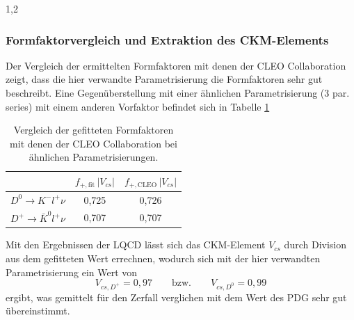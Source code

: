 \documentclass[11pt,a4paper,twoside]{report}
\begin{document}
\begin{spacing}{1,2}
\subsubsection*{Formfaktorvergleich und Extraktion des CKM-Elements}
Der Vergleich der ermittelten Formfaktoren mit denen der CLEO Collaboration \cite{PhysRev_Data} zeigt, dass die hier verwandte Parametrisierung die Formfaktoren
sehr gut beschreibt. Eine Gegenüberstellung mit einer ähnlichen Parametrisierung (3 par. series) mit einem anderen Vorfaktor befindet sich in Tabelle \ref{tab_formvergleich}
\begin{table}[h]
 \begin{tabular}{c|cc}
 \toprule
  & $f_{+,\text{fit}}\,|V_{cs}|$ & $f_{+,\text{CLEO}}\,|V_{cs}|$ \\
  \midrule
  $D^0 \rightarrow K^- l^+ \nu$ & 0,725 & 0,726 \\
  $D^+ \rightarrow \bar K^0 l^+ \nu$ & 0,707 & 0,707  \\
  \bottomrule\bottomrule
 \end{tabular}
\caption{Vergleich der gefitteten Formfaktoren mit denen der CLEO Collaboration bei ähnlichen Parametrisierungen.}
\label{tab_formvergleich}
\end{table}

\noindent
Mit den Ergebnissen der LQCD \cite{PhysRev_Data} lässt sich das CKM-Element $V_{cs}$ durch Division aus dem gefitteten Wert errechnen, wodurch sich mit der hier
verwandten Parametrisierung ein Wert von
\begin{equation}
 V_{cs,D^+} = 0,97 \qquad \text{bzw.} \qquad V_{cs,D^0} = 0,99
\end{equation}
ergibt, was gemittelt für den Zerfall verglichen mit dem Wert des PDG \cite{PDG} sehr gut übereinstimmt.


% 
% 
% 


\end{spacing}
\end{document}
